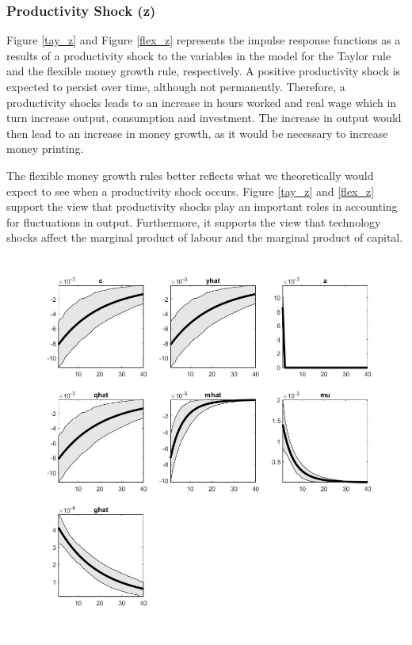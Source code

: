 \documentclass[11pt,preprint, authoryear]{elsarticle}
\let\origfigure\figure
\let\endorigfigure\endfigure
\renewenvironment{figure}[1][2] {
    \expandafter\origfigure\expandafter[H]
} {
    \endorigfigure
}
\numberwithin{equation}{section}
\numberwithin{figure}{section}
\numberwithin{table}{section}
\begin{document}
\hypertarget{productivity-shock-z}{%
\subsubsection{Productivity Shock (z)}\label{productivity-shock-z}}

Figure \ref{tay_z} and Figure \ref{flex_z} represents the impulse
response functions as a results of a productivity shock to the variables
in the model for the Taylor rule and the flexible money growth rule,
respectively. A positive productivity shock is expected to persist over
time, although not permanently. Therefore, a productivity shocks leads
to an increase in hours worked and real wage which in turn increase
output, consumption and investment. The increase in output would then
lead to an increase in money growth, as it would be necessary to
increase money printing.

The flexible money growth rules better reflects what we theoretically
would expect to see when a productivity shock occurs. Figure \ref{tay_z}
and \ref{flex_z} support the view that productivity shocks play an
important roles in accounting for fluctuations in output. Furthermore,
it supports the view that technology shocks affect the marginal product
of labour and the marginal product of capital.

\begin{figure}
\centering
\includegraphics[scale=0.3]{tay_z.jpg}
\caption{Orthogonalized Shock to Productivity Shock - Taylor Rule}
\label{tay_z}
\end{figure}
\end{document}
